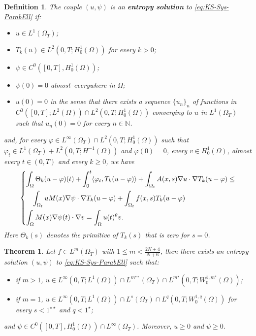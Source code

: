 \documentclass{amsart}
\numberwithin{equation}{section}
\newtheorem{dhef}[example]{Definition}
\newtheorem{theo}[example]{Theorem}
\def\elle#1{L^{#1}}
\def\elleom#1{L^{#1}(\Omega)}
\def\elleomT#1{L^{#1}(\Omega_T)}
\def\Sobom#1{W^{1,#1}_0(\Omega)}
\def\Hom{H^1_0(\Omega)}
\def\io{\int_\Omega}
\def\iot{\int_{\Omega_t}}
\def\N{\mathbb{N}}
\begin{document}
\begin{dhef}\label{Def:entropysol}
    The couple $(u,\psi)$ is an \textbf{entropy solution} to \eqref{eq:KS-Sys-ParabEll} if:
    \begin{itemize}
        \item $u\in\elleomT1$;
        \item $T_k(u)\in\elle2(0,T;\Hom)$ for every $k>0$;
        \item $\psi\in C^0([0,T],\Hom)$;
        \item $\psi(0)=0$ almost--everywhere in $\Omega$;
        \item $u(0)=0$ in the sense that there exists a sequence $\{u_n\}_n$ of functions in $C^0([0, T] ; L^2(\Omega)) \cap L^2(0, T ;\Hom)$ converging to $u$ in $\elleomT1$ such that $u_n(0)=0$ for every $n\in\N$.
    \end{itemize}
    and, for every $\varphi\in\elleomT\infty\cap\elle2(0,T;\Hom)$ such that $\varphi_t\in \elleomT 1+ \elle2(0,T;H^{-1}(\Omega))$ and $\varphi(0)=0$, every $v\in\Hom$, almost every $t\in(0,T)$ and every $k\geq0$, we have
    \begin{equation}
        \begin{dcases}
                \io \Theta_k(u-\varphi)(t)+\int_0^t \langle \varphi_t,T_k(u-\varphi)\rangle+
                \iot A(x,s)\nabla u\cdot \nabla T_k(u-\varphi) \leq
                \\ \quad\iot u M(x)\nabla \psi\cdot\nabla T_k(u-\varphi) + \iot f(x,s)T_k(u-\varphi)\\
                \io M(x)\nabla \psi(t)\cdot\nabla v = \io u(t)^\theta v.
        \end{dcases}
    \end{equation}
    Here $\Theta_k(s)$ denotes the primitive of $T_k(s)$ that is zero for $s=0$.
\end{dhef}

\begin{theo}\label{Main_Theorem_4}
    Let $f\in\elleomT m$ with $1\leq m<\frac{2N+4}{N+6}$, then there exists an entropy solution $(u,\psi)$ to \eqref{eq:KS-Sys-ParabEll} such that:
    \begin{itemize}
        \item if $m>1$, $u\in\elle\infty(0,T;\elleom1)\cap\elleomT {m^{\star\star}} \cap \elle {m^\star}(0,T;\Sobom {m^\star})$;
        \item if $m=1$, $u\in\elle\infty(0,T;\elleom1)\cap\elleomT s \cap \elle q(0,T;\Sobom q)$ for every $s<1^{\star\star}$ and $q<1^\star$;
    \end{itemize}
    and $\psi\in C^0([0,T],\Hom)\cap\elleomT\infty$. Moreover, $u\geq0$ and $\psi\geq0$.
\end{theo}
\end{document}
